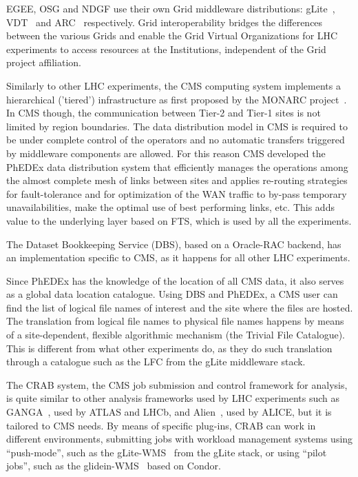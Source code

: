EGEE, OSG and NDGF use their own Grid middleware distributions: gLite~\cite{RefgLite}, VDT~\cite{RefVDT} and ARC~\cite{RefARC} respectively. Grid interoperability bridges the differences between the various Grids and enable the Grid Virtual Organizations for LHC experiments to access resources at the Institutions, independent of the Grid project affiliation.

Similarly to other LHC experiments, the CMS computing system 
implements a hierarchical ('tiered') infrastructure as first proposed by the MONARC project~\cite{RefMONARC}. 
In CMS though, the communication between Tier-2 and Tier-1 sites is not limited by region boundaries. The data distribution model in CMS is required to be
under complete control of the operators and no automatic transfers triggered
by middleware components are allowed. For this reason CMS developed the
PhEDEx data distribution system that efficiently manages the operations 
among the almost complete mesh of links between sites and 
applies re-routing strategies for fault-tolerance and %
for optimization of
the WAN traffic to by-pass temporary unavailabilities, make the optimal use of best performing links, etc.
This adds
value to the underlying layer based on FTS, which is used by all the
experiments.

The Dataset Bookkeeping Service (DBS), based on a Oracle-RAC backend, has an 
implementation specific to CMS, as it happens for all other LHC experiments.


Since PhEDEx has the knowledge of the location of all CMS data, it also
serves as a global data location catalogue. Using DBS and PhEDEx, a CMS user
can find the list of logical file names of interest and the site where the
files are hosted. 
The translation from logical file names to physical file names happens 
by means of a site-dependent, flexible algorithmic mechanism (the Trivial File Catalogue). 
This is different from what other experiments do, as they do such translation through
 a catalogue such as the LFC from the gLite middleware stack.

The CRAB system, the CMS job submission and control framework for analysis, is quite
similar to other analysis frameworks used by LHC experiments such as GANGA~\cite{RefGANGA}, used by ATLAS and LHCb, and Alien~\cite{RefAlien}, used by ALICE, 
but it is tailored to CMS needs. By means of specific plug-ins, CRAB can work in
different environments, submitting jobs with workload management systems
using ``push-mode'', such as the gLite-WMS~\cite{RefgLiteWMS} from the gLite 
stack, or using ``pilot jobs'', such as the glidein-WMS~\cite{Refglidein} based on Condor.



